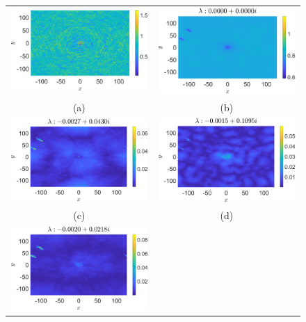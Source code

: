\documentclass[a4paper,11pt]{article}
\begin{document}
\begin{figure}[!ht]
\centering
\begin{tabular}{cc}
\includegraphics[width=.525\textwidth]{amplitude_hfforce_K_256_Lx_128_tf_2e4} &\hspace{-15pt} \includegraphics[width=.51\textwidth]{mean_hfforce_K_256_Lx_128_tf_2e4} \\
(a) & (b)\\
\includegraphics[width=.525\textwidth]{osc1_hfforce_K_256_Lx_128_tf_2e4} &\hspace{-15pt} \includegraphics[width=.51\textwidth]{osc2_hfforce_K_256_Lx_128_tf_2e4} \\
(c) & (d)\\
\includegraphics[width=.525\textwidth]{osc3_hfforce_K_256_Lx_128_tf_2e4} & \\

\end{tabular}
\end{figure}
\end{document}
